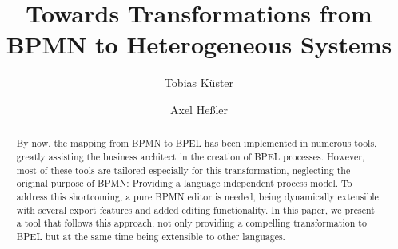 \documentclass[lnbip]{svmultln}
\begin{document}
\mainmatter

\pagestyle{empty}

\title{Towards Transformations from BPMN to Heterogeneous Systems}

\author{Tobias K\"{u}ster \and Axel He\ss{}ler} %


\maketitle

\begin{abstract}
By now, the mapping from BPMN to BPEL has been implemented in numerous tools, greatly assisting the business architect in the creation of BPEL processes.  However, most of these tools are tailored especially for this transformation, neglecting the original purpose of BPMN: Providing a language independent process model.  To address this shortcoming, a pure BPMN editor is needed, being dynamically extensible with several export features and added editing functionality.  In this paper, we present a tool that follows this approach, not only providing a compelling transformation to BPEL but at the same time being extensible to other languages.
\end{abstract}










\end{document}
